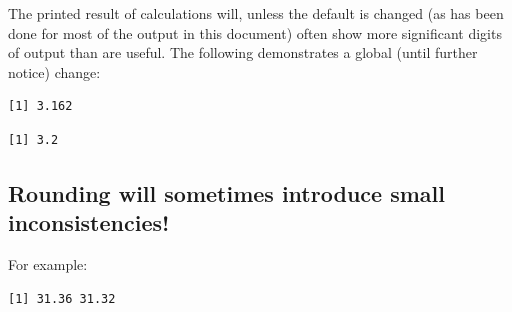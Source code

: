 The printed result of calculations will, unless the default is changed
(as has been done for most of the output in this document) often
show more significant digits of output than are useful.  The following
demonstrates a global (until further notice) change:

\begin{knitrout}
\color{fgcolor}\begin{kframe}
\begin{alltt}
\hlstd{(}\hlstd{)}
\end{alltt}
\begin{verbatim}
[1] 3.162
\end{verbatim}
\begin{alltt}
 \hlkwb{<-} \hlstd{(}\hlstd{=}\hlstd{)} 
\hlstd{(}\hlstd{)}
\end{alltt}
\begin{verbatim}
[1] 3.2
\end{verbatim}
\begin{alltt}
             
\end{alltt}
\end{kframe}
\end{knitrout}

\subsection*{Rounding will sometimes introduce small inconsistencies!}

For example:
\begin{knitrout}
\color{fgcolor}\begin{kframe}
\begin{alltt}
\hlstd{(}\hlstd{(}\hlopt{*}\hlstd{(}\hlopt{/}\hlstd{),} \hlstd{),}  \hlopt{*}\hlstd{(}\hlstd{(}\hlopt{/}\hlstd{),} \hlstd{))}
\end{alltt}
\begin{verbatim}
[1] 31.36 31.32
\end{verbatim}
\end{kframe}
\end{knitrout}

